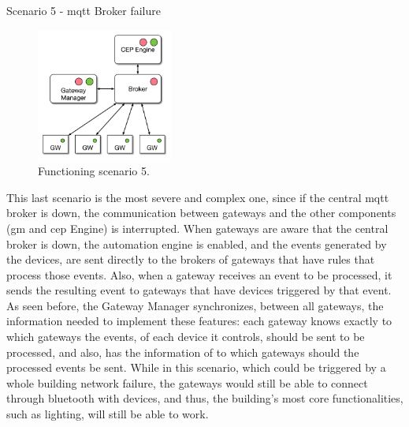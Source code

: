 \begin{Paragraph}{Scenario 5 - \ac{mqtt} Broker failure}
	\begin{figure}[H]
		\centering
		\includegraphics[width=0.4\textwidth]{figures/fs3.png}
		\caption{Functioning scenario 5.}
		\label{fig:fs3}
	\end{figure}

This last scenario is the most severe and complex one, since if the central \ac{mqtt} broker is down, the communication between gateways and the other components (\ac{gm} and \ac{cep} Engine) is interrupted. When gateways are aware that the central broker is down, the automation engine is enabled, and the events generated by the devices, are sent directly to the brokers of gateways that have rules that process those events. Also, when a gateway receives an event to be processed, it sends the resulting event to gateways that have devices triggered by that event. As seen before, the Gateway Manager synchronizes, between all gateways, the information needed to implement these features: each gateway knows exactly to which gateways the events, of each device it controls, should be sent to be processed, and also, has the information of to which gateways should the processed events be sent. While in this scenario, which could be triggered by a whole building network failure, the gateways would still be able to connect through bluetooth with devices, and thus, the building's most core functionalities, such as lighting, will still be able to work. 

\end{Paragraph}

